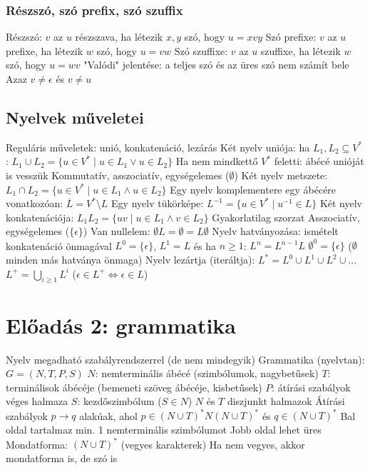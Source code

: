 \documentclass[12pt,a4paper]{article}
\begin{document}
\subsubsection{Részszó, szó prefix, szó szuffix}

\begin{outline}
	\1 Részszó: $v$ az $u$ részszava, ha létezik $x,y$ szó, hogy $u=xvy$
	\1 Szó prefixe: $v$ az $u$ prefixe, ha létezik $w$ szó, hogy $u=vw$
	\1 Szó szuffixe: $v$ az $u$ szuffixe, ha létezik $w$ szó, hogy $u=wv$
	\1 "Valódi" jelentése: a teljes szó és az üres szó nem számít bele
		\2 Azaz $v \ne \epsilon$ és $v \ne u$
\end{outline}

\subsection{Nyelvek műveletei}

\begin{outline}
	\1 Reguláris műveletek: unió, konkatenáció, lezárás
	\1 Két nyelv uniója: ha $L_1,L_2 \subseteq V^*$: $L_1 \cup L_2 = \{u \in V^* \;|\; u \in L_1 \lor u \in L_2\}$
		\2 Ha nem mindkettő $V^*$ feletti: ábécé unióját is vesszük
		\2 Kommutatív, asszociatív, egységelemes ($\emptyset$)
	\1 Két nyelv metszete: $L_1 \cap L_2 = \{u \in V^* \;|\; u \in L_1 \wedge u \in L_2\}$
	\1 Egy nyelv komplementere egy ábécére vonatkozóan: $\overline{L} = V^* \setminus L$
	\1 Egy nyelv tükörképe: $L^{-1} = \{u \in V^* \;|\; u^{-1} \in L \}$
	\1 Két nyelv konkatenációja: $L_1 L_2 = \{uv \;|\; u \in L_1 \wedge v \in L_2\}$
		\2 Gyakorlatilag szorzat
		\2 Asszociatív, egységelemes ($\{\epsilon\}$)
		\2 Van nullelem: $\emptyset L = \emptyset = L \emptyset$
	\1 Nyelv hatványozása: ismételt konkatenáció önmagával
		\2 $L^0 = \{\epsilon\}$, $L^1=L$ és ha $n \ge 1$: $L^n=L^{n-1}L$
		\2 $\emptyset^0 = \{\epsilon\}$ \; ($\emptyset$ minden más hatványa önmaga)
	\1 Nyelv lezártja (iteráltja): $L^*=L^0 \cup L^1 \cup L^2 \cup ...$
		\2 $L^+ = \bigcup\limits_{i \ge 1} L^i$ \; ($\epsilon \in L^+ \Leftrightarrow \epsilon \in L$)
\end{outline}

\pagebreak

\section{Előadás 2: grammatika}

\begin{outline}
	\1 Nyelv megadható szabályrendszerrel (de nem mindegyik)
	\1 Grammatika (nyelvtan): $G=(N,T,P,S)$
		\2 $N$: nemterminális ábécé (szimbólumok, nagybetűsek)
		\2 $T$: terminálisok ábécéje (bemeneti szöveg ábécéje, kisbetűsek)
		\2 $P$: átírási szabályok véges halmaza
		\2 $S$: kezdőszimbólum ($S \in N$)
		\2 $N$ és $T$ diszjunkt halmazok
	\1 Átírási szabályok 
		\2 $p \to q$ alakúak, ahol $p \in (N \cup T)^*N(N \cup T)^*$ és $q \in (N \cup T)^*$
			\3 Bal oldal tartalmaz min. 1 nemterminális szimbólumot
			\3 Jobb oldal lehet üres
		\2 Mondatforma: $(N \cup T)^*$ (vegyes karakterek)
			\3 Ha nem vegyes, akkor mondatforma is, de szó is
\end{outline}
\end{document}
